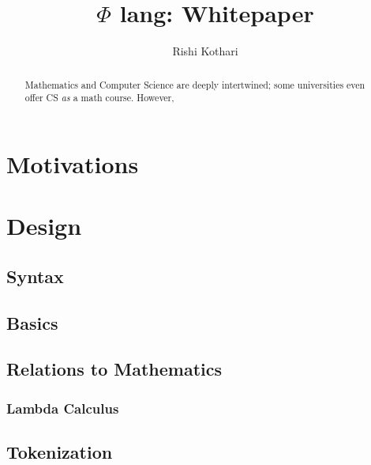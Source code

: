 \documentclass[11pt, oneside]{article}
\title{$\Phi$ lang: Whitepaper}
\author{Rishi Kothari}
\date{}
\begin{document}
\maketitle

\newpage

\tableofcontents
\newpage
{}
\begin{abstract}
	Mathematics and Computer Science are deeply intertwined; some universities even offer CS \textit{as} a math course. However, 
\end{abstract}

\section{Motivations}


\section{Design}

\subsection{Syntax}


\subsection{Basics}


\subsection{Relations to Mathematics}

\subsubsection{Lambda Calculus}

\subsection{Tokenization}
\end{document}
